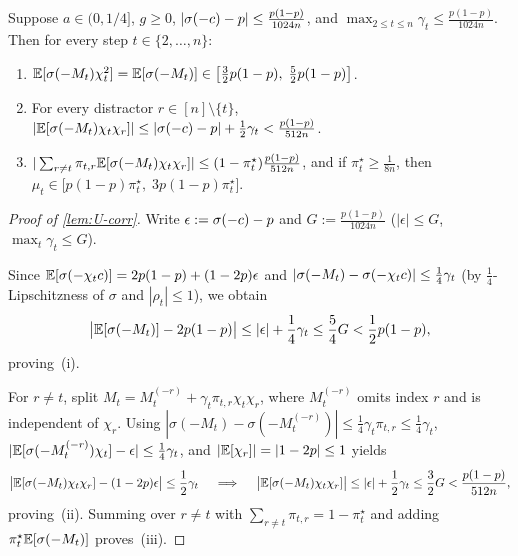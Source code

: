 \begin{lemma}
\label{lem:U-corr}
Suppose $a \in (0, 1/4]$, $g \ge 0$, $|\sigma(-c) - p| \le \frac{p(1-p)}{1024n}$, and $\max_{2\le t\le n}\gamma_t \le \frac{p(1-p)}{1024n}$. Then for every step $t \in \{2,\ldots,n\}$:
\begin{enumerate}[label=(\roman*),leftmargin=*]
\item $\mathbb E[\sigma(-M_t)\chi_t^2] = \mathbb E[\sigma(-M_t)] \in \bigl[\frac{3}{2}p(1-p),\; \frac{5}{2}p(1-p)\bigr]$.
\item For every distractor $r \in [n]\setminus\{t\}$, $|\mathbb E[\sigma(-M_t)\chi_t\chi_r]| \le |\sigma(-c) - p| + \frac{1}{2}\gamma_t < \frac{p(1-p)}{512n}$.
\item $|\sum_{r\ne t}\pi_{t,r}\mathbb E[\sigma(-M_t)\chi_t\chi_r]| \le (1 - \pi_t^\star)\frac{p(1-p)}{512n}$, and if $\pi_t^\star \ge \frac{1}{8n}$, then $\mu_t \in \bigl[p(1-p)\pi_t^\star,\; 3p(1-p)\pi_t^\star\bigr]$.
\end{enumerate}
\end{lemma}
\begin{proof}[Proof of \cref{lem:U-corr}]
Write $\epsilon := \sigma(-c) - p$ and $G := \frac{p(1-p)}{1024n}$ ($|\epsilon| \le G$, $\max_t\gamma_t \le G$).

Since $\mathbb E[\sigma(-\chi_tc)] = 2p(1-p) + (1-2p)\epsilon$ and $|\sigma(-M_t) - \sigma(-\chi_tc)| \le \frac{1}{4}\gamma_t$ (by $\frac{1}{4}$-Lipschitzness of $\sigma$ and $|\rho_t| \le 1$), we obtain
\[
  \bigl|\mathbb E[\sigma(-M_t)] - 2p(1-p)\bigr| \le |\epsilon| + \frac{1}{4}\gamma_t \le \frac{5}{4}G < \frac{1}{2}p(1-p),
\]
proving~(i).

For $r \ne t$, split $M_t = M_t^{(-r)} + \gamma_t\pi_{t,r}\chi_t\chi_r$, where $M_t^{(-r)}$ omits index $r$ and is independent of $\chi_r$. Using $|\sigma(-M_t) - \sigma(-M_t^{(-r)})| \le \frac{1}{4}\gamma_t\pi_{t,r} \le \frac{1}{4}\gamma_t$, $|\mathbb E[\sigma(-M_t^{(-r)})\chi_t] - \epsilon| \le \frac{1}{4}\gamma_t$, and $|\mathbb E[\chi_r]| = |1-2p| \le 1$ yields
\[
  \bigl|\mathbb E[\sigma(-M_t)\chi_t\chi_r] - (1-2p)\epsilon\bigr| \le \frac{1}{2}\gamma_t
  \quad\implies\quad
  \bigl|\mathbb E[\sigma(-M_t)\chi_t\chi_r]\bigr| \le |\epsilon| + \frac{1}{2}\gamma_t \le \frac{3}{2}G < \frac{p(1-p)}{512n},
\]
proving~(ii). Summing over $r \ne t$ with $\sum_{r\ne t}\pi_{t,r} = 1 - \pi_t^\star$ and adding $\pi_t^\star\mathbb E[\sigma(-M_t)]$ proves~(iii).
\end{proof}

